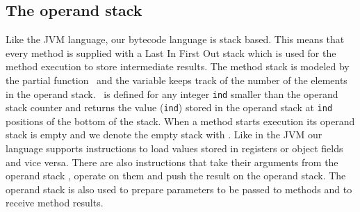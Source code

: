 \subsection{The operand stack}

Like the JVM language, our bytecode language is stack based. This means that every method is supplied with a Last In First Out
 stack which is used for the method execution to store intermediate results.
The method stack is modeled by the partial function \stackOnly \ and the variable
\counterOnly keeps track of the number of the elements in the operand stack. 
 \stackOnly \ is defined for any integer \texttt{ind} smaller than the operand stack counter \counterOnly 
 and returns the value \stackOnly(\texttt{ind})  stored in the operand stack at \texttt{ind}
 positions of the bottom of the stack. When a method starts execution its operand stack is empty and we denote the empty stack
 with \newStack. Like in the JVM our language supports instructions to load values stored in registers or object fields and vice versa.
 There are also instructions that take their arguments from the operand stack \stackOnly, operate on them and push the result on the operand
 stack. The operand stack is also used to prepare parameters to be passed to methods and to receive method results.   
